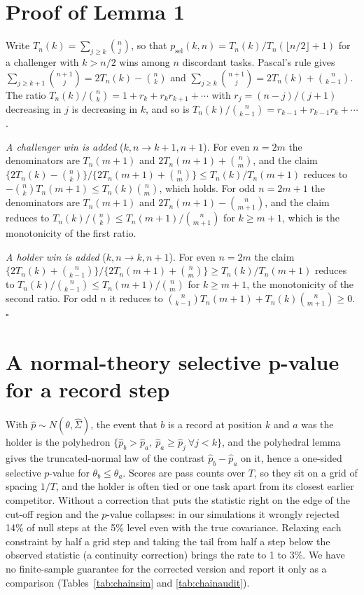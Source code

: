 \documentclass[11pt]{article}
\renewcommand{\hat}{\widehat}
\begin{document}
\section{Proof of Lemma 1}\label{app:lemma}
Write $T_n(k)=\sum_{j\ge k}\binom nj$, so that $p_{\mathrm{sel}}(k,n)=T_n(k)/T_n(\lfloor n/2\rfloor+1)$ for a challenger with $k>n/2$ wins among $n$ discordant tasks.
Pascal's rule gives $\sum_{j\ge k+1}\binom{n+1}{j}=2T_n(k)-\binom nk$ and $\sum_{j\ge k}\binom{n+1}{j}=2T_n(k)+\binom n{k-1}$.
The ratio $T_n(k)/\binom nk=1+r_k+r_kr_{k+1}+\cdots$ with $r_j=(n-j)/(j+1)$ decreasing in $j$ is decreasing in $k$, and so is $T_n(k)/\binom n{k-1}=r_{k-1}+r_{k-1}r_k+\cdots$.

\emph{A challenger win is added} ($k,n\to k+1,n+1$).
For even $n=2m$ the denominators are $T_n(m+1)$ and $2T_n(m+1)+\binom nm$, and the claim $\{2T_n(k)-\binom nk\}/\{2T_n(m+1)+\binom nm\}\le T_n(k)/T_n(m+1)$ reduces to $-\binom nk T_n(m+1)\le T_n(k)\binom nm$, which holds.
For odd $n=2m+1$ the denominators are $T_n(m+1)$ and $2T_n(m+1)-\binom n{m+1}$, and the claim reduces to $T_n(k)/\binom nk\le T_n(m+1)/\binom n{m+1}$ for $k\ge m+1$, which is the monotonicity of the first ratio.

\emph{A holder win is added} ($k,n\to k,n+1$).
For even $n=2m$ the claim $\{2T_n(k)+\binom n{k-1}\}/\{2T_n(m+1)+\binom nm\}\ge T_n(k)/T_n(m+1)$ reduces to $T_n(k)/\binom n{k-1}\le T_n(m+1)/\binom nm$ for $k\ge m+1$, the monotonicity of the second ratio.
For odd $n$ it reduces to $\binom n{k-1}T_n(m+1)+T_n(k)\binom n{m+1}\ge0$. $\square$

\section{A normal-theory selective p-value for a record step}\label{app:poly}
With $\hat p\sim N(\theta,\hat\Sigma)$, the event that $b$ is a record at position $k$ and $a$ was the holder is the polyhedron $\{\hat p_b>\hat p_a,\ \hat p_a\ge\hat p_j\ \forall j<k\}$, and the polyhedral lemma~\citep{lee2016exact} gives the truncated-normal law of the contrast $\hat p_b-\hat p_a$ on it, hence a one-sided selective $p$-value for $\theta_b\le\theta_a$.
Scores are pass counts over $T$, so they sit on a grid of spacing $1/T$, and the holder is often tied or one task apart from its closest earlier competitor.
Without a correction that puts the statistic right on the edge of the cut-off region and the $p$-value collapses: in our simulations it wrongly rejected 14\% of null steps at the 5\% level even with the true covariance.
Relaxing each constraint by half a grid step and taking the tail from half a step below the observed statistic (a continuity correction) brings the rate to 1 to 3\%.
We have no finite-sample guarantee for the corrected version and report it only as a comparison (Tables~\ref{tab:chainsim} and \ref{tab:chainaudit}).
\end{document}
